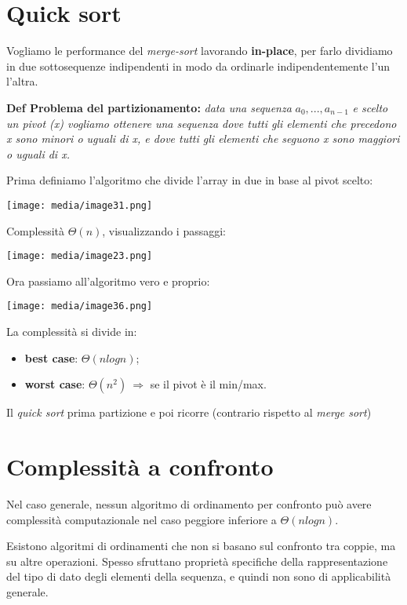 \section{Quick sort}\label{quick-sort}

Vogliamo le performance del \emph{merge-sort} lavorando
\textbf{in-place}, per farlo dividiamo in due sottosequenze indipendenti
in modo da ordinarle indipendentemente l'un l'altra.

\textbf{Def \textbar{} Problema del partizionamento:} \emph{data una
sequenza} \(a_{0},...,a_{n - 1}\) \emph{e scelto un pivot (x) vogliamo
ottenere una sequenza dove tutti gli elementi che precedono x sono
minori o uguali di x, e dove tutti gli elementi che seguono x sono
maggiori o uguali di x.}

Prima definiamo l'algoritmo che divide l'array in due in base al pivot
scelto:

\texttt{[image: media/image31.png]}

Complessità \(\Theta(n)\), visualizzando i passaggi:

\texttt{[image: media/image23.png]}

Ora passiamo all'algoritmo vero e proprio:

\texttt{[image: media/image36.png]}

La complessità si divide in:

\begin{itemize}
\item
  \textbf{best case}: \(\Theta(nlogn)\);
\item
  \textbf{worst case}: \(\Theta(n^{2})\  \Rightarrow\) se il pivot è il
  min/max.
\end{itemize}

Il \emph{quick sort} prima partizione e poi ricorre (contrario rispetto
al \emph{merge sort})

\section{Complessità a confronto}\label{complessituxe0-a-confronto}

Nel caso generale, nessun algoritmo di ordinamento per confronto può
avere complessità computazionale nel caso peggiore inferiore a
\(\Theta(nlogn)\).

Esistono algoritmi di ordinamenti che non si basano sul confronto tra
coppie, ma su altre operazioni. Spesso sfruttano proprietà specifiche
della rappresentazione del tipo di dato degli elementi della sequenza, e
quindi non sono di applicabilità generale.

